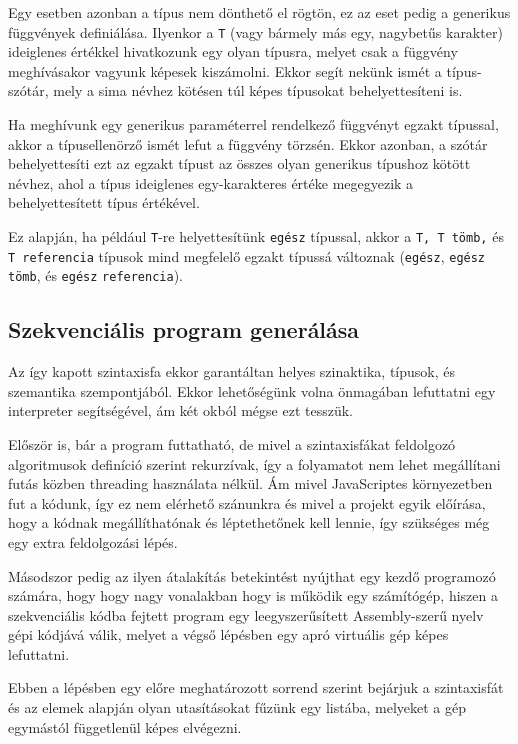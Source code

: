 Egy esetben azonban a típus nem dönthető el rögtön, ez az eset pedig a generikus függvények definiálása. Ilyenkor a \texttt{T} (vagy bármely más egy, nagybetűs karakter) ideiglenes értékkel hivatkozunk egy olyan típusra, melyet csak a függvény meghívásakor vagyunk képesek kiszámolni. Ekkor segít nekünk ismét a típus-szótár, mely a sima névhez kötésen túl képes típusokat behelyettesíteni is.

Ha meghívunk egy generikus paraméterrel rendelkező függvényt egzakt típussal, akkor a típusellenörző ismét lefut a függvény törzsén. Ekkor azonban, a szótár behelyettesíti ezt az egzakt típust az összes olyan generikus típushoz kötött névhez, ahol a típus ideiglenes egy-karakteres értéke megegyezik a behelyettesített típus értékével.

Ez alapján, ha például \texttt{T}-re helyettesítünk \texttt{egész} típussal, akkor a \texttt{T, T tömb,} és \texttt{T referencia} típusok mind megfelelő egzakt típussá változnak (\texttt{egész}, \texttt{egész} \texttt{tömb}, és \texttt{egész} \texttt{referencia}).

\subsection{Szekvenciális program generálása}
\label{sec:compiler}

Az így kapott szintaxisfa ekkor garantáltan helyes szinaktika, típusok, és szemantika szempontjából. Ekkor lehetőségünk volna önmagában lefuttatni egy interpreter segítségével, ám két okból mégse ezt tesszük.

Először is, bár a program futtatható, de mivel a szintaxisfákat feldolgozó algoritmusok definíció szerint rekurzívak, így a folyamatot nem lehet megállítani futás közben threading használata nélkül. Ám mivel JavaScriptes környezetben fut a kódunk, így ez nem elérhető szánunkra és mivel a projekt egyik előírása, hogy a kódnak megállíthatónak és léptethetőnek kell lennie, így szükséges még egy extra feldolgozási lépés.

Másodszor pedig az ilyen átalakítás betekintést nyújthat egy kezdő programozó számára, hogy hogy nagy vonalakban hogy is működik egy számítógép, hiszen a szekvenciális kódba fejtett program egy leegyszerűsített Assembly-szerű nyelv gépi kódjává válik, melyet a végső lépésben egy apró virtuális gép képes lefuttatni.

Ebben a lépésben egy előre meghatározott sorrend szerint bejárjuk a szintaxisfát és az elemek alapján olyan utasításokat fűzünk egy listába, melyeket a gép egymástól függetlenül képes elvégezni.

